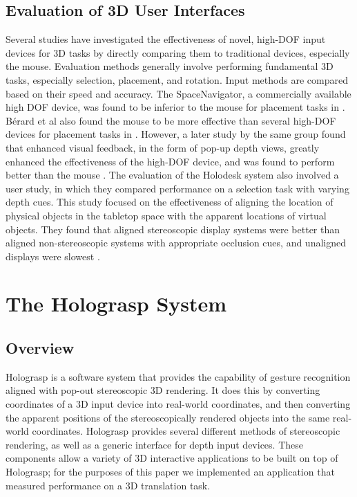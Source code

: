 \documentclass[pageno]{jpaper}
\begin{document}
\subsection{Evaluation of 3D User Interfaces}
Several studies have investigated the effectiveness of novel, high-DOF input devices for 3D tasks by directly comparing them to traditional devices, especially the mouse.
Evaluation methods generally involve performing fundamental 3D tasks, especially selection, placement, and rotation. Input methods are compared based on their
speed and accuracy. The SpaceNavigator, a commercially available high DOF device, was found to be inferior to the mouse for placement tasks in
\cite{mattheiss2011navigating}. B{\'e}rard et al also found the mouse to be more effective than several high-DOF devices for placement tasks
in \cite{study1}.  However, a later study by the same group found that enhanced visual feedback, in the form of pop-up depth views, greatly enhanced the effectiveness
of the high-DOF device, and was found to perform better than the mouse \cite{study2}. The
evaluation of the Holodesk system also involved a user study, in which they compared performance on a selection task with varying depth cues. This study focused on
the effectiveness of aligning the location of physical objects in the tabletop space with the apparent locations of virtual objects. They found that aligned
stereoscopic display systems were better than aligned non-stereoscopic systems with appropriate occlusion cues, and unaligned displays were slowest \cite{holodesk}.
\newpage
\section{The Holograsp System}
\subsection{Overview}
Holograsp is a software system that provides the capability of gesture recognition aligned with pop-out stereoscopic 3D rendering. 
It does this by converting coordinates of a 3D input device into real-world coordinates, and then converting the 
apparent positions of the stereoscopically rendered objects into the same real-world coordinates. 
Holograsp provides several different methods of stereoscopic rendering, as well as
a generic interface for depth input devices. These components allow a variety of 3D interactive applications to be built on top of Holograsp;
for the purposes of this paper we implemented an application that measured performance on a 3D translation task.
\end{document}
